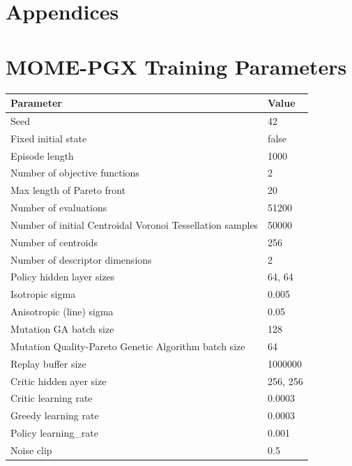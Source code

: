 \documentclass[12pt]{article}
\begin{document}
\newpage




 \clearpage
 
\section*{Appendices}
\appendix
 \section{MOME-PGX Training Parameters} \label{appendix:params}
 \begin{table}[H]
\centering
\begin{tabular}{|l|l|}
\hline
\textbf{Parameter} & \textbf{Value} \\ \hline
Seed & 42 \\ \hline
Fixed initial state & false \\ \hline
Episode length & 1000 \\ \hline
Number of objective functions & 2 \\ \hline
Max length of Pareto front & 20 \\ \hline
Number of evaluations & 51200 \\ \hline
Number of initial Centroidal Voronoi Tessellation samples & 50000 \\ \hline
Number of centroids & 256 \\ \hline
Number of descriptor dimensions & 2 \\ \hline
Policy hidden layer sizes & 64, 64 \\ \hline
Isotropic sigma & 0.005 \\ \hline
Anisotropic (line) sigma & 0.05 \\ \hline
Mutation GA batch size & 128 \\ \hline
Mutation Quality-Pareto Genetic Algorithm batch size & 64 \\ \hline
Replay buffer size & 1000000 \\ \hline
Critic hidden ayer size & 256, 256 \\ \hline
Critic learning rate & 0.0003 \\ \hline
Greedy learning rate & 0.0003 \\ \hline
Policy learning\_rate & 0.001 \\ \hline
Noise clip & 0.5 \\ \hline

\end{tabular}
\end{table}
\end{document}
